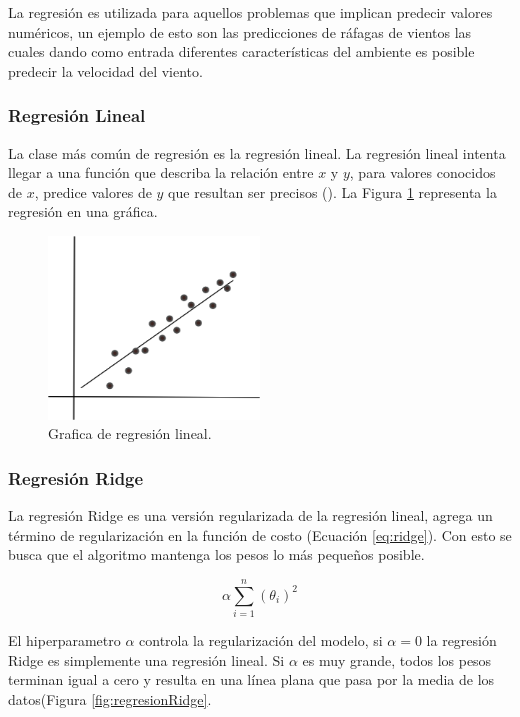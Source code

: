 La regresión es utilizada para aquellos problemas que implican predecir valores numéricos, un ejemplo de esto son las predicciones de ráfagas de vientos las cuales dando como entrada diferentes características del ambiente es posible predecir la velocidad del viento.

\subsubsection{Regresión Lineal}

La clase más común de regresión es la regresión lineal. La regresión lineal intenta llegar a una función que describa la relación entre $x$ y $y$, para valores conocidos de $x$, predice valores de $y$ que resultan ser precisos (\cite{patterson2017deep}). La Figura \ref{fig:regresionLineal} representa la regresión en una gráfica.

\begin{figure}[H]
    \centering
    \includegraphics[width=0.5\textwidth]{MarcoTeorico/imgs/RegresionLineal.png}
    \caption{Grafica de regresión lineal.}
    \label{fig:regresionLineal}
\end{figure}

\subsubsection{Regresión Ridge}

La regresión Ridge es una versión regularizada de la regresión lineal, agrega un término de regularización en la función de costo (Ecuación \ref{eq:ridge}). Con esto se busca que el algoritmo mantenga los pesos lo más pequeños posible.

\begin{equation}
    \label{eq:ridge}
    \alpha \displaystyle\sum\limits_{i=1}^n (\theta_i)^{2}
\end{equation}

El hiperparametro $\alpha$ controla la regularización del modelo, si $\alpha = 0$ la regresión Ridge es simplemente una regresión lineal. Si $\alpha$ es muy grande, todos los pesos terminan igual a cero y resulta en una línea plana que pasa por la media de los datos(Figura \ref{fig:regresionRidge}.

